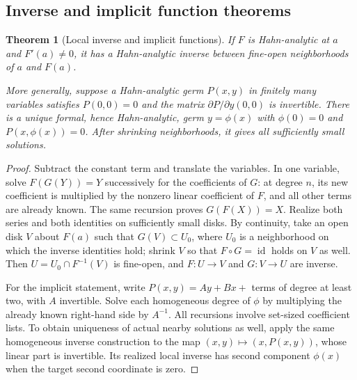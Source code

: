 \documentclass[11pt,a4paper]{article}
\numberwithin{equation}{section}
\newtheorem{theorem}{Theorem}[section]
\theoremstyle{definition}
\theoremstyle{remark}
\newcommand{\id}{\operatorname{id}}
\begin{document}
\subsection{Inverse and implicit function theorems}
\begin{theorem}[Local inverse and implicit functions]
\label{thm:localinverse}
If $F$ is Hahn-analytic at $a$ and $F'(a)\ne0$, it has a Hahn-analytic inverse between fine-open neighborhoods of $a$ and $F(a)$.

More generally, suppose a Hahn-analytic germ $P(x,y)$ in finitely many variables satisfies $P(0,0)=0$ and the matrix $\partial P/\partial y(0,0)$ is invertible. There is a unique formal, hence Hahn-analytic, germ $y=\phi(x)$ with $\phi(0)=0$ and $P(x,\phi(x))=0$. After shrinking neighborhoods, it gives all sufficiently small solutions.
\end{theorem}
\begin{proof}
Subtract the constant term and translate the variables. In one variable, solve
$F(G(Y))=Y$ successively for the coefficients of $G$: at degree $n$, its new coefficient is multiplied by the nonzero linear coefficient of $F$, and all other terms are already known. The same recursion proves $G(F(X))=X$. Realize both series and both identities on sufficiently small disks. By continuity, take an open disk $V$ about $F(a)$ such that $G(V)\subset U_0$, where $U_0$ is a neighborhood on which the inverse identities hold; shrink $V$ so that $F\circ G=\id$ holds on $V$ as well. Then $U=U_0\cap F^{-1}(V)$ is fine-open, and $F:U\to V$ and $G:V\to U$ are inverse.

For the implicit statement, write $P(x,y)=Ay+Bx+$ terms of degree at least two, with $A$ invertible. Solve each homogeneous degree of $\phi$ by multiplying the already known right-hand side by $A^{-1}$. All recursions involve set-sized coefficient lists. To obtain uniqueness of actual nearby solutions as well, apply the same homogeneous inverse construction to the map $(x,y)\mapsto(x,P(x,y))$, whose linear part is invertible. Its realized local inverse has second component $\phi(x)$ when the target second coordinate is zero.
\end{proof}
\end{document}
